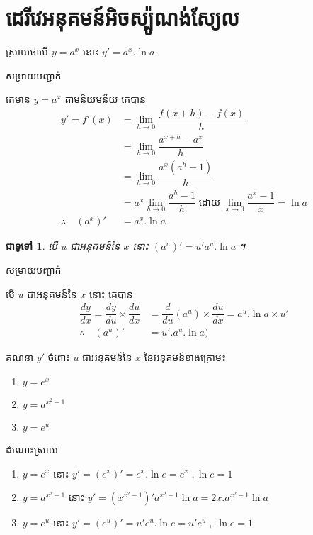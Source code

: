 \documentclass[12pt,fleqn]{book} %
\newtheorem{general}{\kml ជាទូទៅ}
\newcommand{\answer}{\begin{center}
\kml \color{magenta} ដំណោះស្រាយ
\end{center}}
\newcommand{\solution}{{\begin{center}\kml \color{magenta} សម្រាយបញ្ជាក់\end{center} }}
\begin{document}
\section{ដេរីវេអនុគមន៍អិចស្ប៉ូណង់ស្យែល}
ស្រាយថាបើ $y=a^x$ នោះ $y'=a^x .\ln a$
\solution
គេមាន $y=a^x$ តាមនិយមន័យ គេបាន
\begin{align*}
y'=f'(x)&=\lim_{h\to 0}\dfrac{f(x+h)-f(x)}{h}\\
&=\lim_{h\to 0}\dfrac{a^{x+h}-a^{x}}{h}\\
&=\lim_{h\to 0}\dfrac{a^{x}(a^h-1)}{h}\\
&=a^{x}\lim_{h\to 0}\dfrac{a^h-1}{h}\;\text{ដោយ}\; \lim_{x\to 0}\dfrac{a^x-1}{x}=\ln a\\
\therefore \quad (a^x)'&=a^x. \ln a
\end{align*}
\begin{general}
បើ $u$ ជាអនុគមន៍នៃ $x$ នោះ $(a^u)'=u'a^u.\ln a$ ។ 
\end{general}
\solution 
បើ $u$ ជាអនុគមន៍នៃ $x$ នោះ  គេបាន 
\begin{align*}
\dfrac{dy}{dx}=\dfrac{dy}{du}\times \dfrac{du}{dx}&=\dfrac{d}{du}(a^u)\times \dfrac{du}{dx}=a^u.\ln a \times u'\\
\therefore \quad (a^u)'&=u'.a^u .\ln a)
\end{align*}
\begin{example}
គណនា $y'$ ចំពោះ $u$ ជាអនុគមន៍នៃ $x$ នៃអនុគមន៍ខាងក្រោម៖
\begin{multicols}{3}
\begin{enumerate}
\item $y=e^x$  
\item $y=a^{x^2-1}$
\item $y=e^u$ 
\end{enumerate}
\end{multicols}
\end{example}
\answer
\begin{enumerate}
 \item  $y=e^x$ នោះ $y'=(e^x)'=e^x.\ln e=e^x\;,\ln e=1$ 
 \item $y=a^{x^2-1}$ នោះ $y'=(x^{x^2-1})'a^{x^2-1}\ln a=2x.a^{x^2-1}\ln a$
\item $y=e^u$ នោះ $y'=(e^u)'=u'e^u.\ln e=u'e^u\;,\;\ln e=1$
\end{enumerate}
\end{document}
